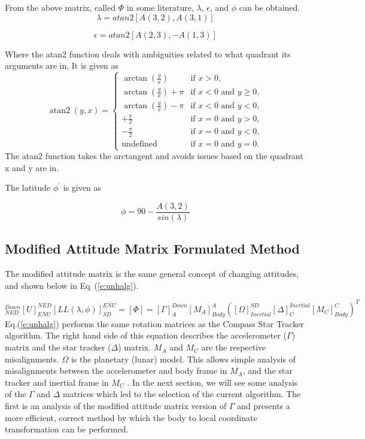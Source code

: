 \documentclass[12pt,a4paper]{book}
\begin{document}
From the above matrix, called $\Phi$ in some literature, $\lambda$, $\epsilon$, and $\phi$ can be obtained.  
\begin{equation}
\lambda = atan2[A(3,2), A(3,1)]
\end{equation}

\begin{equation}
\epsilon = atan2[A(2,3), -A(1,3)]
\end{equation}

Where the atan2 function deals with ambiguities related to what quadrant its arguments are in.  It is given as
\begin{equation}
\operatorname{atan2}(y,x) =
\begin{cases}
\arctan(\frac y x) &\text{if } x > 0, \\
\arctan(\frac y x) + \pi &\text{if } x < 0 \text{ and } y \ge 0, \\
\arctan(\frac y x) - \pi &\text{if } x < 0 \text{ and } y < 0, \\
+\frac{\pi}{2} &\text{if } x = 0 \text{ and } y > 0, \\
-\frac{\pi}{2} &\text{if } x = 0 \text{ and } y < 0, \\
\text{undefined} &\text{if } x = 0 \text{ and } y = 0.
\end{cases}
\end{equation}
The atan2 function takes the arctangent and avoids issues based on the quadrant x and y are in.

The latitude $\phi^{'}$ is given as

\begin{equation}
	\phi = 90 - \frac{A(3,2)}{sin(\lambda)}
\end{equation}
\subsection*{Modified Attitude Matrix Formulated Method}
The modified attitude matrix is the same general concept of changing attitudes, and shown below in Eq~(\ref{e:unhalg}).  

\small{\begin{equation}
[H(\epsilon)]^{Down}_{NED}[U]^{NED}_{ENU}[LL(\lambda,\phi)]^{ENU}_{SD} = [\Phi] = [\Gamma]^{Down}_{A}[M_{A}]^{A}_{Body}([\Omega]^{SD}_{Inertial}[\Delta]^{Inertial}_{C}[M_{C}]^{C}_{Body})^{T}
\label{e:unhalg}
\end{equation}}
Eq.(\ref{e:unhalg}) performs the same rotation matrices as the Compass Star Tracker algorithm.  The right hand side of this equation describes the accelerometer ($\Gamma$) matrix and the star tracker ($\Delta$) matrix. $M_{A}$ and $M_{C}$ are the respective misalignments.  $\Omega$ is the planetary (lunar) model.  This allows simple analysis of misalignments between the accelerometer and body frame in $M_{A}$, and the star tracker  and inertial frame in $M_{C}$ \cite{b:quinn}.  In the next section, we will see some analysis of the $\Gamma$ and $\Delta$ matrices which led to the selection of the current algorithm.  The first is an analysis of the modified attitude matrix version of $\Gamma$ and presents a more efficient, correct method by which the body to local coordinate transformation can be performed.
\end{document}
